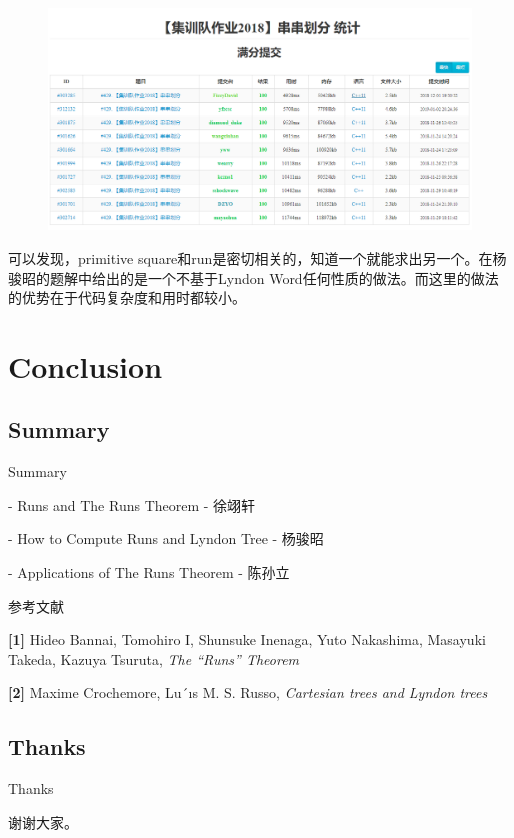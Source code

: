 \documentclass{beamer}
\begin{document}
\begin{frame}
\begin{figure}[h]%
	\centering 
	\includegraphics[width=0.7\linewidth]{figures/runtime.png}
\end{figure}
	\par 可以发现，primitive square和run是密切相关的，知道一个就能求出另一个。在杨骏昭的题解中给出的是一个不基于Lyndon Word任何性质的做法。而这里的做法的优势在于代码复杂度和用时都较小。
\end{frame}

\section{Conclusion}

\subsection{Summary}

\begin{frame}{Summary}
    \par - Runs and The Runs Theorem - 徐翊轩
	\pause
    \par - How to Compute Runs and Lyndon Tree - 杨骏昭
	\pause
    \par - Applications of The Runs Theorem - 陈孙立
\end{frame}

\begin{frame}{参考文献}
	\par \textbf{[1]} Hideo Bannai, Tomohiro I, Shunsuke Inenaga, Yuto Nakashima, Masayuki Takeda, Kazuya Tsuruta, \emph{The “Runs” Theorem}
	\par \textbf{[2]} Maxime Crochemore, Lu´ıs M. S. Russo, \emph{Cartesian trees and Lyndon trees}
\end{frame}

\subsection{Thanks}

\begin{frame}{Thanks}
    \par 谢谢大家。
\end{frame}
\end{document}

